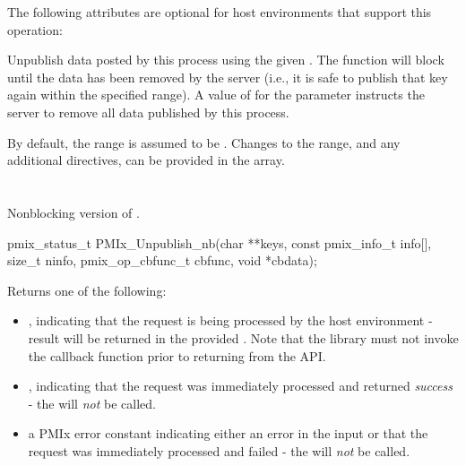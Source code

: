 \reqattrend

\optattrstart
The following attributes are optional for host environments that support this operation:


\optattrend

\descr

Unpublish data posted by this process using the given .
The function will block until the data has been removed by the server (i.e., it is safe to publish that key again within the specified range).
A value of  for the  parameter instructs the server to remove all data published by this process.

By default, the range is assumed to be .
Changes to the range, and any additional directives, can be provided in the  array.


\section{}

\summary

Nonblocking version of .

\format

\cspecificstart
\begin{codepar}
pmix_status_t
PMIx_Unpublish_nb(char **keys,
                  const pmix_info_t info[], size_t ninfo,
                  pmix_op_cbfunc_t cbfunc, void *cbdata);
\end{codepar}
\cspecificend

\begin{arglist}
\end{arglist}

Returns one of the following:

\begin{itemize}
    \item {}, indicating that the request is being processed by the host environment - result will be returned in the provided . Note that the library must not invoke the callback function prior to returning from the \ac{API}.
    \item {}, indicating that the request was immediately processed and returned \textit{success} - the  will \textit{not} be called.
    \item a PMIx error constant indicating either an error in the input or that the request was immediately processed and failed - the  will \textit{not} be called.
\end{itemize}

